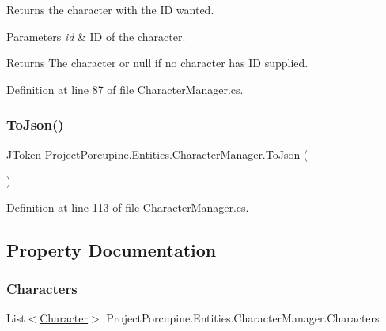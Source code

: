 Returns the character with the ID wanted. 


\begin{DoxyParams}{Parameters}
{\em id} & ID of the character. \\
\hline
\end{DoxyParams}
\begin{DoxyReturn}{Returns}
The character or null if no character has ID supplied. 
\end{DoxyReturn}


Definition at line 87 of file Character\+Manager.\+cs.

\mbox{\label{class_project_porcupine_1_1_entities_1_1_character_manager_aa12ac490f3e9f2197831e50f291b50a3}} 
\subsubsection{\texorpdfstring{To\+Json()}{ToJson()}}
{\footnotesize\ttfamily J\+Token Project\+Porcupine.\+Entities.\+Character\+Manager.\+To\+Json (\begin{DoxyParamCaption}{ }\end{DoxyParamCaption})}



Definition at line 113 of file Character\+Manager.\+cs.



\subsection{Property Documentation}
\mbox{\label{class_project_porcupine_1_1_entities_1_1_character_manager_a09c3aa1467a21d4ae1b671503f20d84d}} 
\subsubsection{\texorpdfstring{Characters}{Characters}}
{\footnotesize\ttfamily List$<$\hyperlink{class_project_porcupine_1_1_entities_1_1_character}{Character}$>$ Project\+Porcupine.\+Entities.\+Character\+Manager.\+Characters\hspace{0.3cm}{\ttfamily [get]}}



